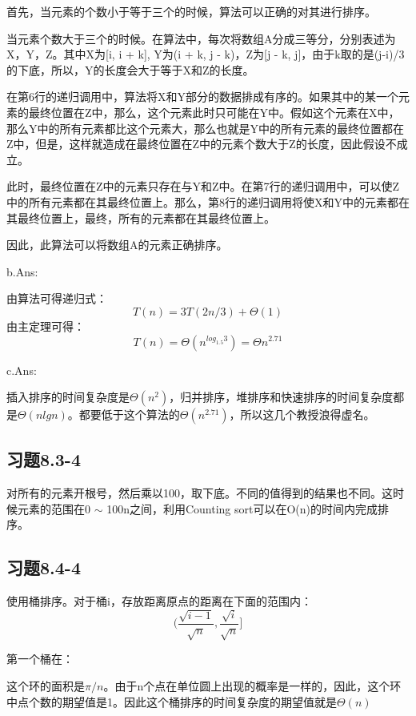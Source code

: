 \documentclass[a4paper, 11pt]{article}
\begin{document}
首先，当元素的个数小于等于三个的时候，算法可以正确的对其进行排序。

当元素个数大于三个的时候。在算法中，每次将数组A分成三等分，分别表述为X，Y，Z。其中X为[i, i + k], Y为(i + k, j - k)，Z为[j - k, j]，由于k取的是(j-i)/3的下底，所以，Y的长度会大于等于X和Z的长度。

在第6行的递归调用中，算法将X和Y部分的数据排成有序的。如果其中的某一个元素的最终位置在Z中，那么，这个元素此时只可能在Y中。假如这个元素在X中，那么Y中的所有元素都比这个元素大，那么也就是Y中的所有元素的最终位置都在Z中，但是，这样就造成在最终位置在Z中的元素个数大于Z的长度，因此假设不成立。

此时，最终位置在Z中的元素只存在与Y和Z中。在第7行的递归调用中，可以使Z中的所有元素都在其最终位置上。那么，第8行的递归调用将使X和Y中的元素都在其最终位置上，最终，所有的元素都在其最终位置上。

因此，此算法可以将数组A的元素正确排序。

b.Ans:

由算法可得递归式：
\begin{displaymath}
	T(n) = 3T(2n/3)+\Theta(1)
\end{displaymath}
由主定理可得：
\begin{displaymath}
	T(n) = \Theta(n ^ {log_{1.5}{3}}) = \Theta{n^{2.71}}
\end{displaymath}

c.Ans:

插入排序的时间复杂度是$\Theta(n^2)$，归并排序，堆排序和快速排序的时间复杂度都是$\Theta(nlgn)$。都要低于这个算法的$\Theta(n^{2.71})$，所以这几个教授浪得虚名。

\subsection{习题8.3-4}

对所有的元素开根号，然后乘以100，取下底。不同的值得到的结果也不同。这时候元素的范围在0 $\sim$ 100n之间，利用Counting sort可以在O(n)的时间内完成排序。

\subsection{习题8.4-4}

使用桶排序。对于桶i，存放距离原点的距离在下面的范围内：
\begin{displaymath}
	(\frac{\sqrt{i - 1}}{\sqrt{n}}, \frac{\sqrt{i}}{\sqrt{n}}]
\end{displaymath}

第一个桶在：
\begin{displaymath}
	[0, \frac{\sqrt{1}}{\sqrt{n}}]
\end{displaymath}

这个环的面积是$\pi/n$。由于n个点在单位圆上出现的概率是一样的，因此，这个环中点个数的期望值是1。因此这个桶排序的时间复杂度的期望值就是$\Theta(n)$
\end{document}
